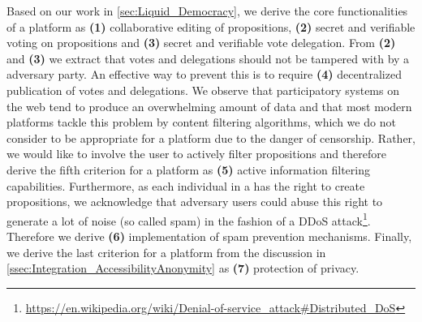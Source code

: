 Based on our work in \ref{sec:Liquid_Democracy}, we derive the core functionalities of a  platform as \textbf{(1)} collaborative editing of propositions, \textbf{(2)} secret and verifiable voting on propositions and \textbf{(3)} secret and verifiable vote delegation.
From \textbf{(2)} and \textbf{(3)} we extract that votes and delegations should not be tampered with by a adversary party.
An effective way to prevent this is to require \textbf{(4)} decentralized publication of votes and delegations.
We observe that participatory systems on the web tend to produce an overwhelming amount of data and that most modern platforms tackle this problem by content filtering algorithms, which we do not consider to be appropriate for a  platform due to the danger of censorship.
Rather, we would like to involve the user to actively filter propositions and therefore derive the fifth criterion for a  platform as \textbf{(5)} active information filtering capabilities.
Furthermore, as each individual in a  has the right to create propositions, we acknowledge that adversary users could abuse this right to generate a lot of noise (so called spam) in the fashion of a DDoS attack\footnote{\url{https://en.wikipedia.org/wiki/Denial-of-service_attack\#Distributed_DoS}}. Therefore we derive \textbf{(6)} implementation of spam prevention mechanisms.
Finally, we derive the last criterion for a  platform from the discussion in \ref{ssec:Integration_AccessibilityAnonymity} as \textbf{(7)} protection of privacy.


